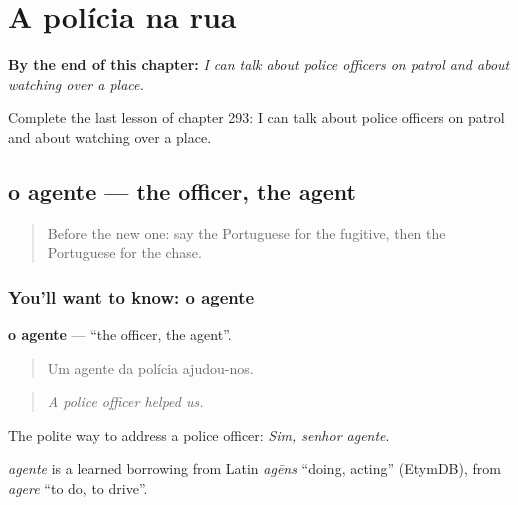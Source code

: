 
\chapter{A polícia na rua}
\label{ch:pt-a-policia-na-rua}

\begin{chapteropening}
\textbf{By the end of this chapter:} \emph{I can talk about police officers on patrol and about watching over a place.}

Complete the last lesson of chapter 293: I can talk about police officers on patrol and about watching over a place.
\end{chapteropening}

\section[o agente]{o agente — the officer, the agent}

\label{lesson:PT-C293-agente}



\begin{quote}
Before the new one: say the Portuguese for the fugitive, then the Portuguese for the chase.
\end{quote}

\subsection*{You'll want to know: o agente}
\textbf{o agente} — \textquotedblleft{}the officer, the agent\textquotedblright{}.

\begin{quote}
Um agente da polícia ajudou-nos.
\end{quote}

\begin{quote}
\emph{A police officer helped us.}
\end{quote}

The polite way to address a police officer: \emph{Sim, senhor agente}.

\begin{cousinweb}
\emph{agente} is a learned borrowing from Latin \emph{agēns} \textquotedblleft{}doing, acting\textquotedblright{} (EtymDB), from \emph{agere} \textquotedblleft{}to do, to drive\textquotedblright{}.
\end{cousinweb}

